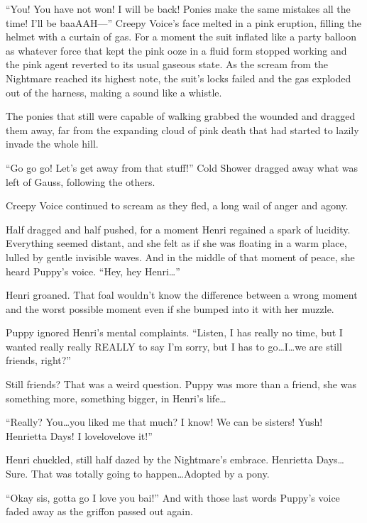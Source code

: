 ``You! You have not won! I will be back! Ponies make the same mistakes all the time! I'll be baaAAH---'' Creepy Voice's face melted in a pink eruption, filling the helmet with a curtain of gas. For a moment the suit inflated like a party balloon as whatever force that kept the pink ooze in a fluid form stopped working and the pink agent reverted to its usual gaseous state. As the scream from the Nightmare reached its highest note, the suit's locks failed and the gas exploded out of the harness, making a sound like a whistle.

The ponies that still were capable of walking grabbed the wounded and dragged them away, far from the expanding cloud of pink death that had started to lazily invade the whole hill.

``Go go go! Let's get away from that stuff!'' Cold Shower dragged away what was left of Gauss, following the others.

Creepy Voice continued to scream as they fled, a long wail of anger and agony.

Half dragged and half pushed, for a moment Henri regained a spark of lucidity. Everything seemed distant, and she felt as if she was floating in a warm place, lulled by gentle invisible waves. And in the middle of that moment of peace, she heard Puppy's voice. ``Hey, hey Henri\dots''

Henri groaned. That foal wouldn't know the difference between a wrong moment and the worst possible moment even if she bumped into it with her muzzle.

Puppy ignored Henri's mental complaints. ``Listen, I has really no time, but I wanted really really REALLY to say I'm sorry, but I has to go\dots I\dots we are still friends, right?''

Still friends? That was a weird question. Puppy was more than a friend, she was something more, something bigger, in Henri's life\dots

``Really? You\dots you liked me that much? I know! We can be sisters! Yush! Henrietta Days! I lovelovelove it!''

Henri chuckled, still half dazed by the Nightmare's embrace. Henrietta Days\dots Sure. That was totally going to happen\dots Adopted by a pony.

``Okay sis, gotta go I love you bai!'' And with those last words Puppy's voice faded away as the griffon passed out again.


\horizonline


